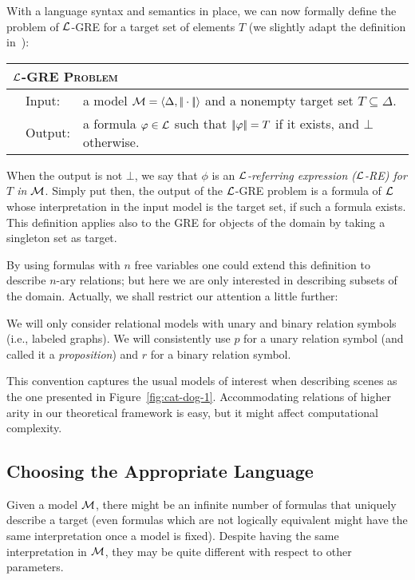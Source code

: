 With a language syntax and semantics in place, we can now formally
define the problem of $\mathcal{L}$-GRE for a target set of elements $T$
(we slightly adapt the definition in~\cite{AKS08}):

\medskip
\noindent
{\small
\begin{center}
\begin{tabular}{ll} \hline
\multicolumn{2}{l}{
\textsc{$\mathcal{L}$-GRE Problem}}\\ \hline
\ \ Input: & a model $\mathcal{M}=\langle \Delta,|\!|\cdot|\!|\rangle$ and a nonempty target  set $T \subseteq \Delta$.\\
\ \ Output: & a formula $\varphi \in \mathcal{L}$ such that
$|\!|\varphi|\!| = T$ if it exists, and $\bot$ otherwise.\\ \hline
\end{tabular}
\end{center}}
When the output is not $\bot$, we say that $\phi$ is an
\emph{$\mathcal{L}$-referring expression ($\mathcal{L}$-RE) for $T$ in $\mathcal{M}$}.
Simply put then, the output of the $\mathcal{L}$-GRE problem is a formula of
$\mathcal{L}$ whose interpretation in the input model is the target set, if
such a formula exists.  This definition applies also to the GRE for
objects of the domain by taking a singleton set as target.

By using  formulas with $n$ free variables one could extend
this definition to describe $n$-ary relations; but here we are only
interested in describing  subsets of the domain. Actually, we shall
restrict our attention a little further:

\begin{convention}\label{conv:signature}
We will only consider relational models with unary and binary relation
symbols (i.e., labeled graphs).  We will consistently use $p$ for a unary relation
symbol (and called it a \emph{proposition}) and $r$ for a binary relation symbol.
\end{convention}

\noindent
This convention captures the usual models of interest when describing scenes
as the one presented in Figure~\ref{fig:cat-dog-1}.  Accommodating relations of
higher arity in our theoretical framework is easy, but it might affect computational complexity.

\subsection{Choosing the Appropriate Language}\label{sec:choosinglanguage}

Given a model $\mathcal{M}$, there might be an infinite number of formulas
that uniquely describe a target (even formulas which are not
logically equivalent might have the same interpretation once a model
is fixed). Despite having the same interpretation in $\mathcal{M}$, they may
be quite different with respect to other parameters.

